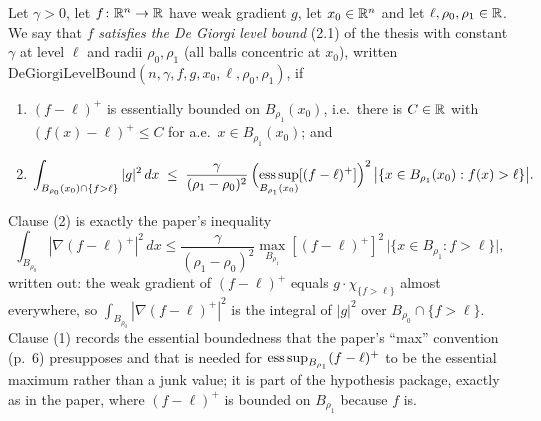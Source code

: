 \begin{definition}
Let $\gamma>0$, let $f\colon\mathbb{R}^n\to\mathbb{R}$ have weak gradient $g$, let
$x_0\in\mathbb{R}^n$ and let $\ell,\rho_0,\rho_1\in\mathbb{R}$.  We say that $f$
\emph{satisfies the De Giorgi level bound} (2.1) of the thesis with constant $\gamma$
at level $\ell$ and radii $\rho_0,\rho_1$ (all balls concentric at $x_0$),
written $\mathrm{DeGiorgiLevelBound}(n,\gamma,f,g,x_0,\ell,\rho_0,\rho_1)$, if
\begin{enumerate}
\item $(f-\ell)^+$ is essentially bounded on $B_{\rho_1}(x_0)$, i.e.\ there is
  $C\in\mathbb{R}$ with $(f(x)-\ell)^+\le C$ for a.e.\ $x\in B_{\rho_1}(x_0)$; and
\item
\[
\int_{B_{\rho_0}(x_0)\cap\{f>\ell\}}|g|^2\,dx
\;\le\;\frac{\gamma}{(\rho_1-\rho_0)^2}\,
\Bigl(\operatorname*{ess\,sup}_{B_{\rho_1}(x_0)}[(f-\ell)^+]\Bigr)^{2}\,
\bigl|\{x\in B_{\rho_1}(x_0):f(x)>\ell\}\bigr| .
\]
\end{enumerate}
Clause (2) is exactly the paper's inequality
\[
\int_{B_{\rho_0}}|\nabla(f-\ell)^+|^2\,dx\le\frac{\gamma}{(\rho_1-\rho_0)^2}
\max_{B_{\rho_1}}[(f-\ell)^+]^2\,\bigl|\{x\in B_{\rho_1}:f>\ell\}\bigr| ,
\]
written out: the weak gradient of $(f-\ell)^+$ equals $g\cdot\chi_{\{f>\ell\}}$
almost everywhere, so $\int_{B_{\rho_0}}|\nabla(f-\ell)^+|^2$ is the integral of
$|g|^2$ over $B_{\rho_0}\cap\{f>\ell\}$.  Clause (1) records the essential
boundedness that the paper's ``max'' convention (p.~6) presupposes and that is
needed for $\operatorname*{ess\,sup}_{B_{\rho_1}}(f-\ell)^+$ to be the essential maximum rather
than a junk value; it is part of the hypothesis package, exactly as in the
paper, where $(f-\ell)^+$ is bounded on $B_{\rho_1}$ because $f$ is.
\end{definition}
